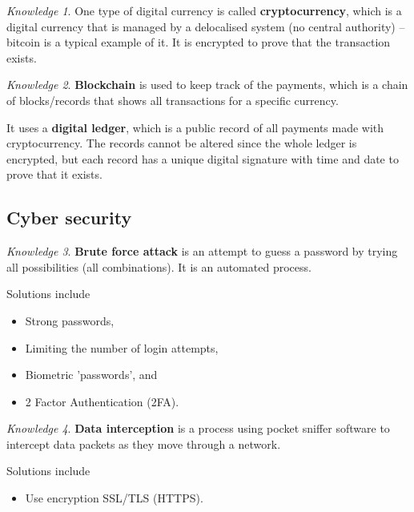 \documentclass[8pt]{article}
\theoremstyle{remark}
\newtheorem{knowledge}{Knowledge}[subsection]
\begin{document}
            \begin{knowledge}
                One type of digital currency is called \textbf{cryptocurrency}, which is a digital currency that is managed by a delocalised system (no central authority) -- bitcoin is a typical example of it. It is encrypted to prove that the transaction exists.
            \end{knowledge}

            \begin{knowledge}
                \textbf{Blockchain} is used to keep track of the payments, which is a chain of blocks/records that shows all transactions for a specific currency.
                
                It uses a \textbf{digital ledger}, which is a public record of all payments made with cryptocurrency. The records cannot be altered since the whole ledger is encrypted, but each record has a unique digital signature with time and date to prove that it exists.
            \end{knowledge}

        \subsection{Cyber security}
            \begin{knowledge}
                \textbf{Brute force attack} is an attempt to guess a password by trying all possibilities (all combinations). It is an automated process.

                Solutions include
                \begin{itemize}
                    \item Strong passwords,
                    \item Limiting the number of login attempts,
                    \item Biometric 'passwords', and
                    \item 2 Factor Authentication (2FA).
                \end{itemize}
            \end{knowledge}

            \begin{knowledge}
                \textbf{Data interception} is a process using pocket sniffer software to intercept data packets as they move through a network.

                Solutions include
                \begin{itemize}
                    \item Use encryption SSL/TLS (HTTPS).
                \end{itemize}
            \end{knowledge}
\end{document}
